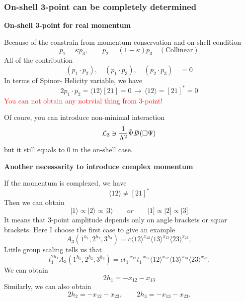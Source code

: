 \documentclass{beamer}
\newcommand{\aket}[1]{|#1\rangle}
\newcommand{\sket}[1]{|#1]}
\newcommand{\avg}[1]{\langle #1 \rangle}
\begin{document}
\begin{frame}
    \frametitle{ On-shell 3-point can be completely determined}
    \textbf{On-shell 3-point for real momentum}

    Because of the constrain from momentum conservation and on-shell condition
    \begin{equation*}
        p_1=\kappa p_3, \qquad p_2=(1-\kappa)p_3 \quad(\text{Collinear})
    \end{equation*}
    All of the contribution 
    \begin{equation*}
        (p_1\cdot p_2),\quad (p_1\cdot p_3),\quad(p_2\cdot p_3)\quad =0  
    \end{equation*}
    In terms of Spinor- Helicity variable, we have 
    \begin{equation*}
        2p_1\cdot p_2=\avg{12}[21]=0\, \longrightarrow \,\avg{12}=[21]^*=0
    \end{equation*}
    \textcolor{red}{You can not obtain any notrvial thing from 3-point!}
    
    Of coure, you can introduce non-minimal interaction
    \begin{equation*}
        \mathcal{L}_3 \ni \frac{1}{\Lambda^2}\bar{\Psi}\slashed{D}(\Box \Psi)
    \end{equation*}
    but it still equals to 0 in the on-shell case.
\end{frame}

\begin{frame}
    \textbf{Another necessarity to introduce complex momentum}

    If the momentum is complexed, we have 
    \begin{equation*}
        \avg{12}\neq[21]^*
    \end{equation*}
    Then we can obtain
    \begin{equation*}
        \aket{1}\propto \aket{2}\propto \aket{3} \qquad or \qquad \sket{1}\propto \sket{2}\propto \sket{3}
    \end{equation*}
    It means that 3-point amplitude depends only on angle brackets or squar brackets. Here I choose the first case to give an example
    \begin{equation*}
        A_3(1^{h_1},2^{h_2},3^{h_3})=c\avg{12}^{x_{12}}\avg{13}^{x_{13}}\avg{23}^{x_{23}},
    \end{equation*}
    Little group scaling tells us that
    \begin{equation*}
        t_1^{2h_1} A_3(1^{h_1},2^{h_2},3^{h_3})=ct_1^{-x_{12}}t_1^{-x_{13}}\avg{12}^{x_{12}}\avg{13}^{x_{13}}\avg{23}^{x_{23}}.
    \end{equation*}
    We can obtain
    \begin{equation*}
        2h_1=-x_{12}-x_{13}
    \end{equation*}
    Similarly, we can also obtain
    \begin{equation*}
        2h_2=-x_{12}-x_{23},\qquad 2h_3=-x_{13}-x_{23}.
    \end{equation*}
\end{frame}
\end{document}
